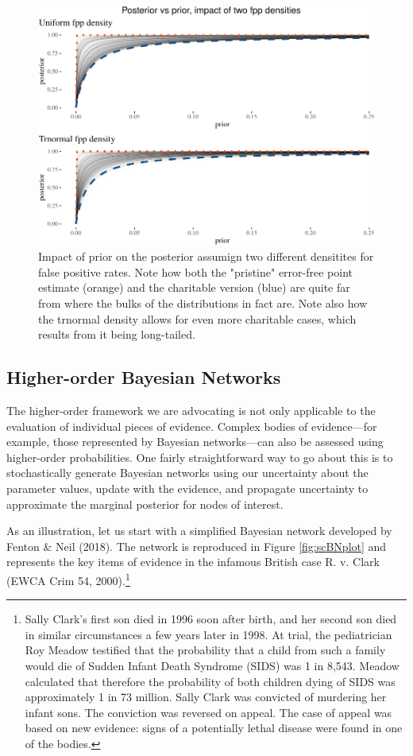 \documentclass[
  10pt,
  dvipsnames,enabledeprecatedfontcommands]{scrartcl}
\begin{document}
\begin{figure}[H]

\begin{center}\includegraphics[width=0.8\linewidth]{paper-outline_files/figure-latex/fig:fplinesPlot3-1} \end{center}
\caption{Impact of prior on the posterior assumign two different densitites for false positive rates. Note how both the "pristine" error-free point estimate (orange) and the charitable version (blue) are quite far from where the bulks of the distributions in fact are. Note also how the trnormal density allows for even more charitable cases, which results from it being long-tailed.}
\label{fig:fplinesPlot}
\end{figure}

\hypertarget{higher-order-bayesian-networks}{%
\subsection{Higher-order Bayesian
Networks}\label{higher-order-bayesian-networks}}

The higher-order framework we are advocating is not only applicable to
the evaluation of individual pieces of evidence. Complex bodies of
evidence---for example, those represented by Bayesian networks---can
also be assessed using higher-order probabilities. One fairly
straightforward way to go about this is to stochastically generate
Bayesian networks using our uncertainty about the parameter values,
update with the evidence, and propagate uncertainty to approximate the
marginal posterior for nodes of interest.

As an illustration, let us start with a simplified Bayesian network
developed by Fenton \& Neil (2018). The network is reproduced in Figure
\ref{fig:scBNplot} and represents the key items of evidence in the
infamous British case R. v. Clark (EWCA Crim 54, 2000).\footnote{Sally
  Clark's first son died in 1996 soon after birth, and her second son
  died in similar circumstances a few years later in 1998. At trial, the
  pediatrician Roy Meadow testified that the probability that a child
  from such a family would die of Sudden Infant Death Syndrome (SIDS)
  was 1 in 8,543. Meadow calculated that therefore the probability of
  both children dying of SIDS was approximately 1 in 73 million. Sally
  Clark was convicted of murdering her infant sons. The conviction was
  reversed on appeal. The case of appeal was based on new evidence:
  signs of a potentially lethal disease were found in one of the bodies.}
\end{document}
